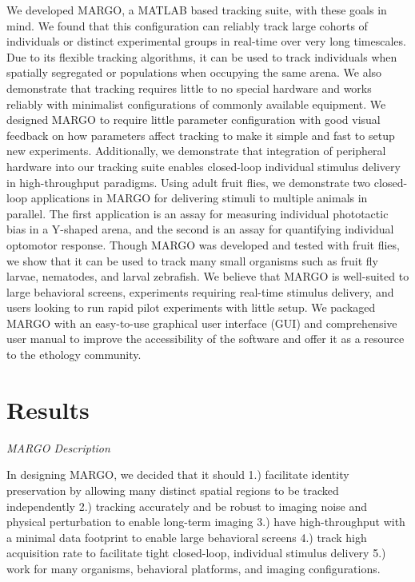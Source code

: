 \documentclass[10pt]{article}
\begin{document}
\begin{multicols}{2}
We developed MARGO, a MATLAB based tracking suite, with these goals in mind. We found that this configuration can reliably track large cohorts of individuals or distinct experimental groups in real-time over very long timescales. Due to its flexible tracking algorithms, it can be used to track individuals when spatially segregated or populations when occupying the same arena. We also demonstrate that tracking requires little to no special hardware and works reliably with minimalist configurations of commonly available equipment. We designed MARGO to require little parameter configuration with good visual feedback on how parameters affect tracking to make it simple and fast to setup new experiments.  Additionally, we demonstrate that integration of peripheral hardware into our tracking suite enables closed-loop individual stimulus delivery in high-throughput paradigms. Using adult fruit flies, we demonstrate two closed-loop applications in MARGO for delivering stimuli to multiple animals in parallel. The first application is an assay for measuring individual phototactic bias in a Y-shaped arena, and the second is an assay for quantifying individual optomotor response. Though MARGO was developed and tested with fruit flies, we show that it can be used to track many small organisms such as fruit fly larvae, nematodes, and larval zebrafish. We believe that MARGO is well-suited to large behavioral screens, experiments requiring real-time stimulus delivery, and users looking to run rapid pilot experiments with little setup. We packaged MARGO with an easy-to-use graphical user interface (GUI) and comprehensive user manual to improve the accessibility of the software and offer it as a resource to the ethology community.

\section*{Results}

\textit{MARGO Description}

In designing MARGO, we decided that it should 1.) facilitate identity preservation by allowing many distinct spatial regions to be tracked independently 2.) tracking accurately and be robust to imaging noise and physical perturbation to enable long-term imaging 3.) have high-throughput with a minimal data footprint to enable large behavioral screens 4.) track high acquisition rate to facilitate tight closed-loop, individual stimulus delivery 5.) work for many organisms, behavioral platforms, and imaging configurations.


\end{multicols}
\end{document}

